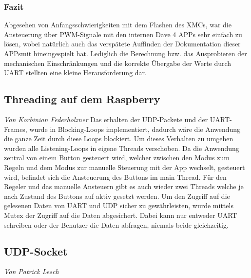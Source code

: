\documentclass[12pt,a4paper,bibliography=totoc,listof=totoc]{scrartcl}
\begin{document}
\subsubsection{Fazit}
Abgesehen von Anfangsschwierigkeiten mit dem Flashen des XMCs, war die Ansteuerung über PWM-Signale 
mit den internen Dave 4 APPs sehr einfach zu lösen, wobei natürlich auch das verspätete Auffinden der Dokumentation dieser APPsmit hineingespielt hat. 
Lediglich die Berechnung bzw. das Ausprobieren der mechanischen Einschränkungen und die korrekte Übergabe der Werte durch UART stellten eine kleine Herausforderung dar. 

\subsection{Threading auf dem Raspberry}
\textit{Von Korbinian Federholzner}\newline
Das erhalten der UDP-Packete und der UART-Frames, wurde in Blocking-Loops implementiert, dadurch wäre die Anwendung 
die ganze Zeit durch diese Loops blockiert. Um dieses Verhalten zu umgehen wurden alle Listening-Loops in eigene Threads
verschoben. Da die Anwendung zentral von einem Button gesteuert wird, welcher zwischen den Modus zum Regeln und dem 
Modus zur manuelle Steuerung mit der App wechselt, gesteuert wird, befindet sich die Ansteuerung des Buttons im main Thread.
Für den Regeler und das manuelle Ansteuern gibt es auch wieder zwei Threads welche je nach Zustand des Buttons auf 
aktiv gesetzt werden. Um den Zugriff auf die gelesenen Daten von UART und UDP sicher zu gewährleisten, wurde mittels 
Mutex der Zugriff auf die Daten abgesichert. Dabei kann nur entweder UART schreiben oder der Benutzer die Daten abfragen,
niemals beide gleichzeitig.


\subsection{UDP-Socket}
\textit{Von Patrick Lesch}\newline

\end{document}
